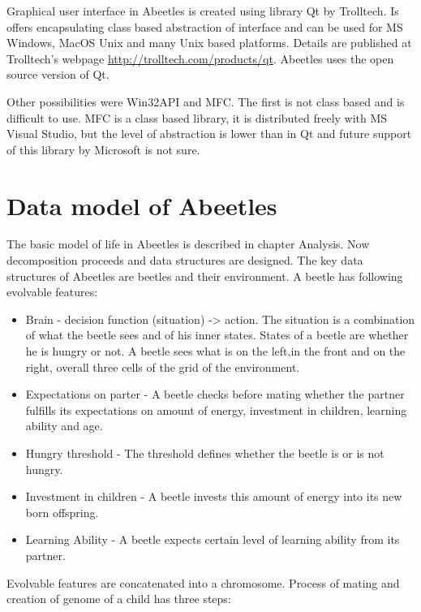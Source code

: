 \documentclass[a4paper,12pt]{report}
\begin{document}
Graphical user interface in Abeetles is created using library Qt by Trolltech. Is offers encapsulating class based abstraction of interface and can be used for MS Windows, MacOS Unix and many Unix based platforms. Details are published at Trolltech's webpage \url{http://trolltech.com/products/qt}. Abeetles uses the open source version of Qt.

Other possibilities were Win32API and MFC. The first is not class based and is difficult to use. MFC is a class based library, it is distributed freely with MS  Visual Studio, but the level of abstraction is lower than in Qt and future support of this library by Microsoft is not sure.


\section{Data model of Abeetles}
The basic model of life in Abeetles is described in chapter Analysis. Now decomposition proceeds and data structures are designed.
The key data structures of Abeetles are beetles and their environment.
A beetle has following evolvable features:
\begin {itemize}
\item Brain - decision function (situation) -> action. The situation is a combination of what the beetle sees and of his inner states. States of a beetle are whether he is hungry or not. A beetle sees what is on the left,in the front and on the right, overall three cells of the grid of the environment.
\item Expectations on parter - A beetle checks before mating whether the partner  fulfills its expectations on amount of energy, investment in children, learning ability and age.
\item Hungry threshold - The threshold defines whether the beetle is or is not hungry.  
\item Investment in children - A beetle invests this amount of energy into its new born offspring.
\item Learning Ability - A beetle expects certain level of learning ability from its partner.
\end {itemize}

Evolvable features are concatenated into a chromosome. Process of mating and creation of genome of a child has three steps:
\end{document}
